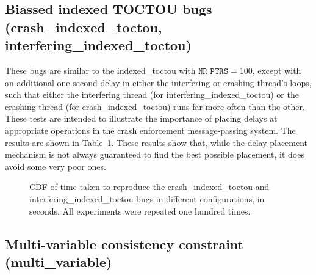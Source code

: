 \subsection{Biassed indexed TOCTOU bugs (crash\_indexed\_toctou, interfering\_indexed\_toctou)}

These bugs are similar to the indexed\_toctou with $\texttt{NR\_PTRS}
= 100$, except with an additional one second delay in either the
interfering or crashing thread's loops, such that either the
interfering thread (for interfering\_indexed\_toctou) or the crashing
thread (for crash\_indexed\_toctou) runs far more often than the
other.  These tests are intended to illustrate the importance of
placing delays at appropriate operations in the crash enforcement
message-passing system.  The results are shown in
Table~\ref{fig:biassed_indexed_toctou:times}.  These results show
that, while the delay placement mechanism is not always guaranteed to
find the best possible placement, it does avoid some very poor ones.

\begin{figure}
  
  \caption{CDF of time taken to reproduce the crash\_indexed\_toctou
    and interfering\_indexed\_toctou bugs in different configurations,
    in seconds.  All experiments were repeated one hundred times.}
  \label{fig:biassed_indexed_toctou:times}
\end{figure}

\subsection{Multi-variable consistency constraint (multi\_variable)}

